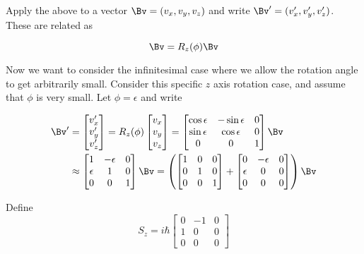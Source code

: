 Apply the above to a vector $\Bv = (v_x, v_y, v_z)$ and write $\Bv' = (v_x', v_y', v_z')$.  These are related as

\begin{equation}\label{eqn:PHY356FDec7:40}
\Bv = R_z(\phi) \Bv
\end{equation}

Now we want to consider the infinitesimal case where we allow the rotation angle to get arbitrarily small.  Consider this specific $z$ axis rotation case, and assume that $\phi$ is very small.  Let $\phi = \epsilon$ and write

\begin{align}\label{eqn:PHY356FDec7:55}
\Bv' &=
\begin{bmatrix}
v_x'  \\
v_y' \\
v_z'
\end{bmatrix}
=
R_z(\phi)
\begin{bmatrix}
v_x \\
v_y \\
v_z
\end{bmatrix}
=
\begin{bmatrix}
\cos \epsilon &- \sin\epsilon & 0 \\
\sin \epsilon & \cos\epsilon & 0 \\
0 & 0 & 1
\end{bmatrix}
\Bv \\
&\approx
\begin{bmatrix}
1 &- \epsilon & 0 \\
\epsilon & 1 & 0 \\
0 & 0 & 1
\end{bmatrix}
\Bv
=
\left(
\begin{bmatrix}
1 & 0 & 0 \\
0 & 1 & 0 \\
0 & 0 & 1
\end{bmatrix}
+
\begin{bmatrix}
0 &- \epsilon & 0 \\
\epsilon & 0 & 0 \\
0 & 0 & 0
\end{bmatrix}
\right)
\Bv
\end{align}

Define
\begin{equation}\label{eqn:PHY356FDec7:60}
S_z = i \hbar
\begin{bmatrix}
0 &- 1 & 0 \\
1 & 0 & 0 \\
0 & 0 & 0
\end{bmatrix}
\end{equation}


